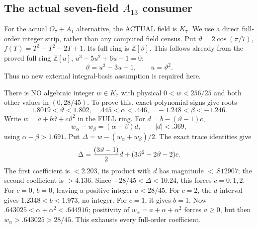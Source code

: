 \subsection{The actual seven-field \(A_{13}\) consumer}
\label{app:arithA13seven}

For the actual \(O_7+A_1\) alternative,
the ACTUAL field is \(K_7\).
We use a direct full-order integer strip,
rather than any computed field census.
Put \(\vartheta=2\cos(\pi/7)\),
\(f(T)=T^3-T^2-2T+1\).
Its full ring is \(\mathbb Z[\vartheta]\).
This follows already from the proved full ring
\(\mathbb Z[u]\), \(u^3-5u^2+6u-1=0\):
\[
                    \vartheta=u^2-3u+1,\qquad u=\vartheta^2 .
\]
Thus no new external integral-basis assumption
is required here.

There is NO algebraic integer \(w\in K_7\)
with physical \(0<w<256/25\) and both other
values in \((0,28/45)\).
To prove this, exact polynomial signs give roots
\[
 1.8019<\vartheta<1.802,\quad .445<\alpha<.446,\quad
                         -1.248<\beta<-1.246 .
\]
Write \(w=a+b\vartheta+c\vartheta^2\) in
the FULL ring.
For \(d=b-(\vartheta-1)c\),
\[
             w_\alpha-w_\beta=(\alpha-\beta)d,\qquad |d|<.369 ,
\]
using \(\alpha-\beta>1.691\).
Put \(\Delta=w-(w_\alpha+w_\beta)/2\).
The exact trace identities give
\[
 \Delta={(3\vartheta-1)\over2}d+
                     (3\vartheta^2-2\vartheta-2)c.
\]
The first coefficient is \(<2.203\), its product
with \(d\) has magnitude \(<.812907\);
the second coefficient is \(>4.136\).
Since \(-28/45<\Delta<10.24\), this forces
\(c=0,1,2\).
For \(c=0\), \(b=0\), leaving a positive integer
\(a<28/45\).
For \(c=2\), the \(d\) interval gives
\(1.2348<b<1.973\), no integer.
For \(c=1\), it gives \(b=1\).
Now
\(.643025<\alpha+\alpha^2<.644916\);
positivity of \(w_\alpha=a+\alpha+\alpha^2\)
forces \(a\ge0\), but then
\(w_\alpha>.643025>28/45\).
This exhausts every full-order coefficient.

